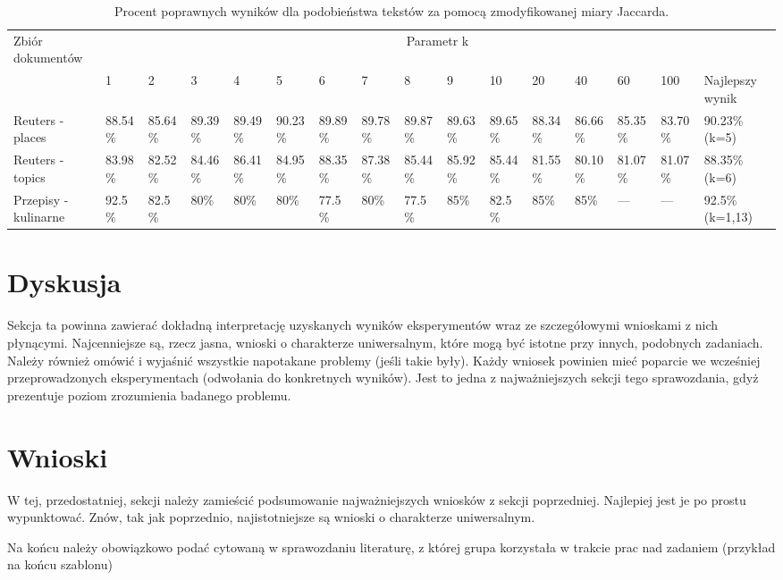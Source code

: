 \documentclass{classrep}
\begin{document}
\begingroup
{\scriptsize  
\setlength{\LTleft}{-20cm plus -1fill}
\setlength{\LTright}{\LTleft}

\begin{longtable}{|p{1cm}|p{0.7cm}|p{0.7cm}|p{0.7cm}|p{0.7cm}|p{0.7cm}|p{0.7cm}|p{0.7cm}|p{0.7cm}|p{0.7cm}|p{0.7cm}|p{0.7cm}|p{0.7cm}|p{0.7cm}|p{0.7cm}|p{1.1cm}|}
\caption{ Procent poprawnych wyników dla podobieństwa tekstów za pomocą zmodyfikowanej miary Jaccarda.}\\ 
\hline

Zbiór
dokumentów

 &\multicolumn{15}{c|}{Parametr k}\\
\cline{2-16}
& 1
& 2
& 3
& 4
& 5
& 6
& 7
& 8
& 9
& 10
& 20
& 40
& 60
& 100
& Najlepszy wynik
\\ \hline\hline
Reuters
- places
& 88.54\%	%
& 85.64\%	%
& 89.39\%	%
& 89.49\%	%
& 90.23\%	%
& 89.89\%	%
& 89.78\%	%
& 89.87\%	%
& 89.63\%	%
& 89.65\%	%
& 88.34\%	%
& 86.66\%	%
& 85.35\%	%
& 83.70\%	%

& 90.23\%	(k=5)
\\ \hline
Reuters
- topics
& 83.98\%	%
& 82.52\%	%
& 84.46\%	%
& 86.41\%	%
& 84.95\%	%
& 88.35\%	%
& 87.38\%	%
& 85.44\%	%
& 85.92\%	%
& 85.44\%	%
& 81.55\%	%
& 80.10\%	%
& 81.07\%	%
& 81.07\%	%

& 88.35\%	(k=6)
\\ \hline
Przepisy
- kulinarne 
& 92.5\%	%
& 82.5\%	%
& 80\%		%
& 80\%		%
& 80\%		%
& 77.5\%	%
& 80\%		%
& 77.5\%	%
& 85\%		%
& 82.5\%	%
& 85\%		%
& 85\%		%
& ---		%
& ---		%
& 92.5\% (k=1,13)
\\ \hline
\end{longtable}
}
\endgroup


\section{Dyskusja}
{\color{blue}
Sekcja ta powinna zawierać dokładną interpretację uzyskanych wyników
eksperymentów wraz ze szczegółowymi wnioskami z nich płynącymi. Najcenniejsze
są, rzecz jasna, wnioski o charakterze uniwersalnym, które mogą być istotne
przy innych, podobnych zadaniach. Należy również omówić i wyjaśnić wszystkie
napotakane problemy (jeśli takie były). Każdy wniosek powinien mieć poparcie
we wcześniej przeprowadzonych eksperymentach (odwołania do konkretnych
wyników). Jest to jedna z najważniejszych sekcji tego sprawozdania, gdyż
prezentuje poziom zrozumienia badanego problemu.}
\section{Wnioski}
{\color{blue}W tej, przedostatniej, sekcji należy zamieścić podsumowanie
najważniejszych wniosków z sekcji poprzedniej. Najlepiej jest je po prostu
wypunktować. Znów, tak jak poprzednio, najistotniejsze są wnioski o
charakterze uniwersalnym.}


\begin{thebibliography}{0}
\end{thebibliography}
{\color{blue} 
Na końcu należy obowiązkowo podać cytowaną w sprawozdaniu
literaturę, z której grupa korzystała w trakcie prac nad zadaniem (przykład na
końcu szablonu)}
\end{document}
